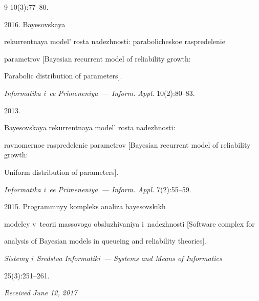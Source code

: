 {{\begin{thebibliography}{9}
10(3):77--80.







 2016. Bayesovskaya 


rekurrentnaya model' rosta nadezhnosti: parabolicheskoe raspredelenie 


parametrov [Bayesian recurrent model of reliability growth: 


Parabolic distribution of parameters]. 


\textit{Informatika i~ee Primeneniya~--- Inform. Appl.} 10(2):80--83.







 2013. 


Bayesovskaya rekurrentnaya model' rosta nadezhnosti: 


ravnomernoe raspredelenie parametrov [Bayesian recurrent model of reliability growth: 


Uniform distribution of parameters]. 


\textit{Informatika i~ee Primeneniya~--- Inform. Appl.} 7(2):55--59.







 2015. Programmnyy kompleks analiza bayesovskikh 


modeley v~teorii massovogo obsluzhivaniya i~nadezhnosti [Software complex for 


analysis of Bayesian models in queueing and reliability theories]. 


\textit{Sistemy i~Sredstva Informatiki~--- Systems and Means of Informatics}


25(3):251--261.


\end{thebibliography}


} }








\vspace*{-3pt}





\hfill{\small\textit{Received June 12, 2017}} 





